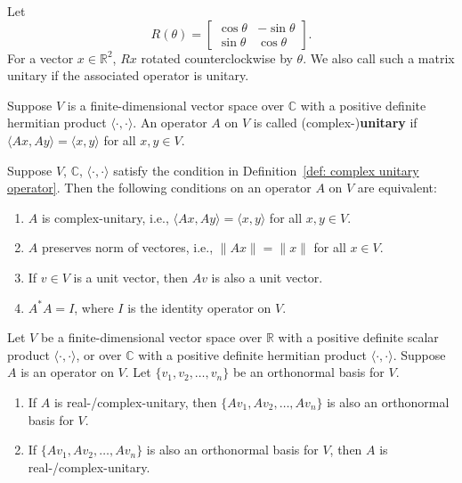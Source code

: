 \documentclass{ctexart}
\newcommand{\R}{\mathbb{R}}
\newcommand{\C}{\mathbb{C}}
\begin{document}
    \begin{myex}
        Let
        $$ R(\theta) = \begin{bmatrix}
            \cos \theta & -\sin \theta \\
            \sin \theta & \cos \theta
        \end{bmatrix}. $$
        For a vector $x\in \R^2$, $R x$ rotated counterclockwise by $\theta$. We also call such a matrix unitary if the associated operator is unitary.
    \end{myex}
    \begin{mydef}\label{def: complex unitary operator}
        Suppose $V$ is a finite-dimensional vector space over $\C$ with a positive definite hermitian product $\langle \cdot, \cdot \rangle$. An operator $A$ on $V$ is called (complex-)\textbf{unitary} if $\langle A x, A y \rangle = \langle x, y \rangle$ for all $x,y \in V$.
    \end{mydef}
    \begin{mythm}
        Suppose $V$, $\C$, $\langle \cdot, \cdot \rangle$ satisfy the condition in Definition~\ref{def: complex unitary operator}. Then the following conditions on an operator $A$ on $V$ are equivalent:
        \begin{enumerate}[label=(\alph*)]
            \item $A$ is complex-unitary, i.e., $\langle A x, A y \rangle = \langle x, y \rangle$ for all $x,y \in V$.
            \item $A$ preserves norm of vectores, i.e., $\|A x\| = \|x\|$ for all $x \in V$.
            \item If $v\in V$ is a unit vector, then $A v$ is also a unit vector.
            \item $A^* A = I$, where $I$ is the identity operator on $V$.
        \end{enumerate}
    \end{mythm}
    \begin{mypro}
        Let $V$ be a finite-dimensional vector space over $\R$ with a positive definite scalar product $\langle \cdot, \cdot \rangle$, or over $\C$ with a positive definite hermitian product $\langle \cdot, \cdot \rangle$. Suppose $A$ is an operator on $V$. Let $\{v_1, v_2, \ldots, v_n\}$ be an orthonormal basis for $V$.
        \begin{enumerate}[label=(\alph*)]
            \item If $A$ is real-/complex-unitary, then $\{A v_1, A v_2, \ldots, A v_n\}$ is also an orthonormal basis for $V$.
            \item If $\{A v_1, A v_2, \ldots, A v_n\}$ is also an orthonormal basis for $V$, then $A$ is real-/complex-unitary.
        \end{enumerate}
    \end{mypro}
\end{document}

